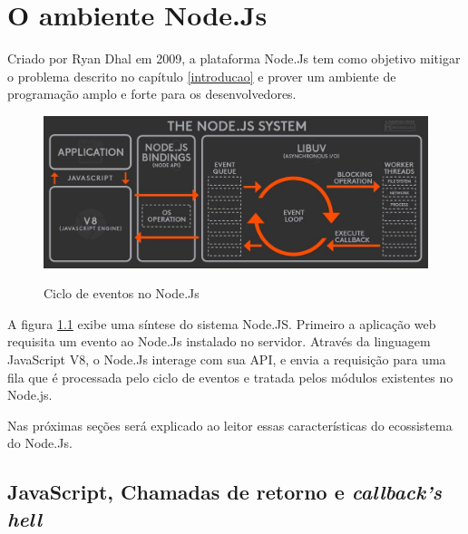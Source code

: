 \chapter{O ambiente Node.Js}
\label{ambiente-node-js}



  Criado por Ryan Dhal em 2009, a plataforma Node.Js tem como objetivo mitigar o problema descrito no capítulo \ref{introducao}
  e prover um ambiente de programação amplo e forte para os desenvolvedores. \cite{Hughes:2012}
  
    \begin{figure}[H]
    \setlength{\abovecaptionskip}{0pt}
    \setlength{\belowcaptionskip}{0pt}
    \caption[Ciclo de eventos no Node.Js]{Ciclo de eventos no Node.Js}
    \centering
    \includegraphics[width=.85\textwidth]{imagem/node-js-system-twitter-BusyRich.png}
    \captionsetup{justification=centering}
    \label{fig:node-js-system-loop}
  \end{figure}
  
  A figura \ref{fig:node-js-system-loop} exibe uma síntese do sistema Node.JS. Primeiro a aplicação web requisita um evento 
  ao Node.Js instalado no servidor. Através da linguagem JavaScript V8, o Node.Js interage com sua \ac{API}, e envia 
  a requisição para uma fila que é processada pelo ciclo de eventos e tratada pelos módulos existentes no Node.js. 
  
  Nas próximas seções será explicado ao leitor essas características do ecossistema do Node.Js.
 
\section{JavaScript, Chamadas de retorno e \textit{callback's hell}}
\label{chamadas-de-retorno-e-callback-hell}

